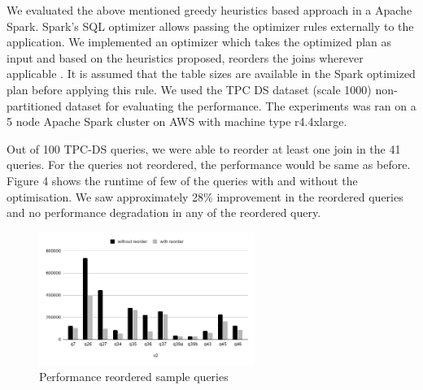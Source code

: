We evaluated the above mentioned greedy heuristics based approach in a Apache Spark. Spark's SQL optimizer allows passing the optimizer rules externally to the application. We implemented an optimizer which takes the optimized plan as input and based on the heuristics proposed, reorders the joins wherever applicable . It is assumed that the table sizes are available in the Spark optimized plan before applying this rule. We used the TPC DS dataset (scale 1000) non-partitioned dataset for evaluating the performance. The experiments was ran on a 5 node Apache Spark cluster on AWS with machine type r4.4xlarge.

Out of 100 TPC-DS queries, we were able to reorder at least one join in the 41 queries. For the queries not reordered, the performance would be same as before. Figure 4 shows the runtime of few of the queries with and without the optimisation. We saw approximately 28\% improvement in the reordered queries and no performance degradation in any of the reordered query.

\begin{figure}[ht]
\centerline{\includegraphics[width=7cm]{fig/chart.png}}
\caption{Performance reordered sample queries}
\label{performance_number}
\end{figure}